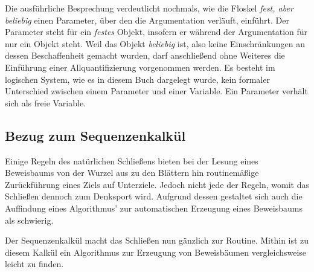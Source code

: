 \noindent
Die ausführliche Besprechung verdeutlicht nochmals, wie die Floskel
\emph{fest, aber beliebig} einen Parameter, über den die Argumentation verläuft,
einführt. Der Parameter steht für ein \emph{festes} Objekt, insofern er
während der Argumentation für nur ein Objekt steht. Weil das Objekt
\emph{beliebig} ist, also keine Einschränkungen an dessen Beschaffenheit
gemacht wurden, darf anschließend ohne Weiteres die Einführung einer
Allquantifizierung vorgenommen werden. Es besteht im logischen System,
wie es in diesem Buch dargelegt wurde, kein formaler Unterschied
zwischen einem Parameter und einer Variable. Ein Parameter verhält sich
als freie Variable.

\subsection{Bezug zum Sequenzenkalkül}

Einige Regeln des natürlichen Schließens bieten bei der Lesung eines
Beweisbaums von der Wurzel aus zu den Blättern hin routinemäßige
Zurückführung eines Ziels auf Unterziele. Jedoch nicht jede der
Regeln, womit das Schließen dennoch zum Denksport wird. Aufgrund dessen
gestaltet sich auch die Auffindung eines Algorithmus' zur automatischen
Erzeugung eines Beweisbaums als schwierig.

Der Sequenzenkalkül macht das Schließen nun gänzlich zur Routine. Mithin
ist zu diesem Kalkül ein Algorithmus zur Erzeugung von Beweisbäumen
vergleichsweise leicht zu finden.

